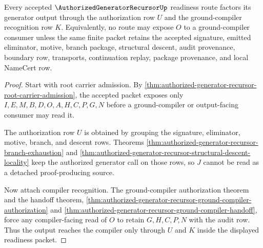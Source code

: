 \begin{theorem}
\label{thm:authorized-generator-recursor-ground-compiler-admission}
Every accepted $\AuthorizedGeneratorRecursorUp$ readiness route factors its
generator output through the authorization row $U$ and the ground-compiler
recognition row $K$. Equivalently, no route may expose $O$ to a
ground-compiler consumer unless the same finite packet retains the accepted
signature, emitted eliminator, motive, branch package, structural descent,
audit provenance, boundary row, transports, continuation replay, package
provenance, and local NameCert row.
\end{theorem}
\begin{proof}
Start with root carrier admission. By
\autoref{thm:authorized-generator-recursor-root-carrier-admission}, the
accepted packet exposes only $I,E,M,B,D,O,A,H,C,P,G,N$ before a
ground-compiler or output-facing consumer may read it.

The authorization row $U$ is obtained by grouping the signature, eliminator,
motive, branch, and descent rows. Theorems
\ref{thm:authorized-generator-recursor-branch-exhaustion} and
\ref{thm:authorized-generator-recursor-structural-descent-locality} keep the
authorized generator call on those rows, so $J$ cannot be read as a detached
proof-producing source.

Now attach compiler recognition. The ground-compiler authorization theorem and
the handoff theorem, \autoref{thm:authorized-generator-recursor-ground-compiler-authorization}
and \autoref{thm:authorized-generator-recursor-ground-compiler-handoff}, force
any compiler-facing read of $O$ to retain $G,H,C,P,N$ with the audit row. Thus
the output reaches the compiler only through $U$ and $K$ inside the displayed
readiness packet.
\end{proof}

